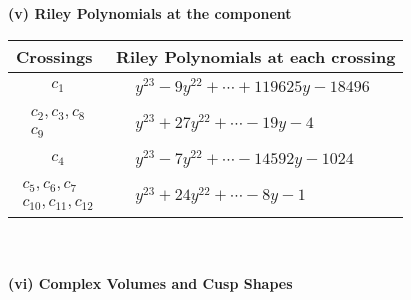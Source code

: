 \documentclass[1p]{elsarticle_modified}
\theoremstyle{definition}
\begin{document}
\newpage\renewcommand{\arraystretch}{1}
\flushleft \textbf{(v) Riley Polynomials at the component}\newline \\
\begin{tabular}{m{50pt}|m{274pt}}
Crossings & \hspace{64pt}Riley Polynomials at each crossing \\
\hline $$\begin{aligned}c_{1}\end{aligned}$$&$\begin{aligned}
&y^{23}-9 y^{22}+\cdots+119625 y-18496
\end{aligned}$\\
\hline $$\begin{aligned}c_{2},c_{3},c_{8}\\c_{9}\end{aligned}$$&$\begin{aligned}
&y^{23}+27 y^{22}+\cdots-19 y-4
\end{aligned}$\\
\hline $$\begin{aligned}c_{4}\end{aligned}$$&$\begin{aligned}
&y^{23}-7 y^{22}+\cdots-14592 y-1024
\end{aligned}$\\
\hline $$\begin{aligned}c_{5},c_{6},c_{7}\\c_{10},c_{11},c_{12}\end{aligned}$$&$\begin{aligned}
&y^{23}+24 y^{22}+\cdots-8 y-1
\end{aligned}$\\
\hline
\end{tabular}\\~\\
\newpage\flushleft \textbf{(vi) Complex Volumes and Cusp Shapes}
\end{document}
